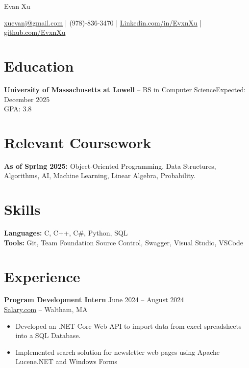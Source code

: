 \documentclass[12pt]{article}       %
\begin{document}
\centerline{\Huge Evan Xu}

\vspace{5pt}

\centerline{\href{mailto:xuevanj@gmail.com}{xuevanj@gmail.com} | (978)-836-3470 | \href{Linkedin.com/in/EvxnXu}{Linkedin.com/in/EvxnXu} | \href{github.com/EvxnXu}{github.com/EvxnXu}}

\vspace{-10pt}

\section*{Education}
\textbf{University of Massachusetts at Lowell} -- BS in Computer Science\hfill Expected: December 2025\\
GPA: 3.8
\vspace{-9pt}

\section*{Relevant Coursework}
\textbf{As of Spring 2025:} Object-Oriented Programming, Data Structures, Algorithms, AI, Machine Learning, Linear Algebra, Probability.

\vspace{-9pt}

\section*{Skills}
\textbf{Languages:} C, C++, C\#, Python, SQL\\
\textbf{Tools:} Git, Team Foundation Source Control, Swagger, Visual Studio, VSCode

\vspace{-9pt}

\section*{Experience}
\textbf{Program Development Intern}  \hfill June 2024 -- August 2024 \\
\href{https://www.salary.com/}{Salary.com} -- Waltham, MA \\
\vspace{-9pt}
\begin{itemize}
  \item Developed an .NET Core Web API to import data from excel spreadsheets into a SQL Database.
  \item  Implemented search solution for newsletter web pages using Apache Lucene.NET and Windows Forms
\end{itemize}
\vspace{-18.5pt}
\end{document}
